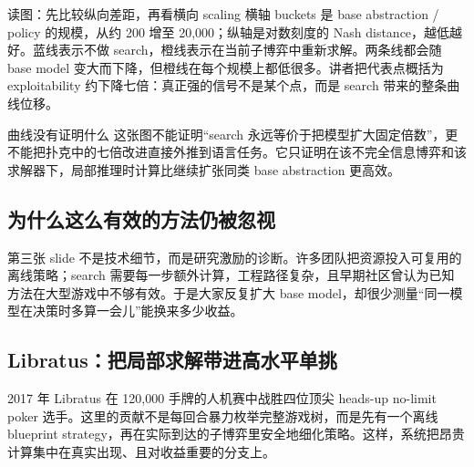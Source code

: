 \begin{knowledgebox}{读图：先比较纵向差距，再看横向 scaling}
横轴 buckets 是 base abstraction / policy 的规模，从约 200 增至 20,000；纵轴是对数刻度的 Nash distance，越低越好。蓝线表示不做 search，橙线表示在当前子博弈中重新求解。两条线都会随 base model 变大而下降，但橙线在每个规模上都低很多。讲者把代表点概括为 exploitability 约下降七倍：真正强的信号不是某个点，而是 search 带来的整条曲线位移。
\end{knowledgebox}

\begin{warningbox}{曲线没有证明什么}
这张图不能证明“search 永远等价于把模型扩大固定倍数”，更不能把扑克中的七倍改进直接外推到语言任务。它只证明在该不完全信息博弈和该求解器下，局部推理时计算比继续扩张同类 base abstraction 更高效。
\end{warningbox}

\subsection{为什么这么有效的方法仍被忽视}

第三张 slide 不是技术细节，而是研究激励的诊断。许多团队把资源投入可复用的离线策略；search 需要每一步额外计算，工程路径复杂，且早期社区曾认为已知方法在大型游戏中不够有效。于是大家反复扩大 base model，却很少测量“同一模型在决策时多算一会儿”能换来多少收益。



\subsection{Libratus：把局部求解带进高水平单挑}

2017 年 Libratus 在 120,000 手牌的人机赛中战胜四位顶尖 heads-up no-limit poker 选手。这里的贡献不是每回合暴力枚举完整游戏树，而是先有一个离线 blueprint strategy，再在实际到达的子博弈里安全地细化策略。这样，系统把昂贵计算集中在真实出现、且对收益重要的分支上。


